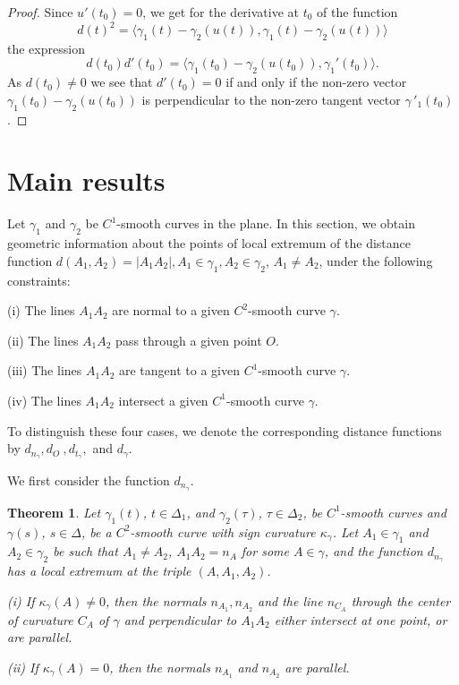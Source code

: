 \documentclass[10pt,a4paper]{amsart}
\newtheorem{thm}{Theorem}
\def\g{\gamma}
\begin{document}
\begin{proof} Since $u'(t_0) =0$, we get for the derivative  at $t_0$ of the function
$$d(t)^2 = \langle \g_1(t) - \g_2(u(t)), \g_1(t) - \g_2(u(t))\rangle$$
the expression
$$ d(t_0) d'(t_0) = \langle \g_1(t_0) - \g_2(u(t_0)), \g_1'(t_0) \rangle.$$
As $d(t_0) \neq 0$ we see that
 $d'(t_0)=0$ if and only if the non-zero vector
 $\g_1(t_0) - \g_2(u(t_0))$ is perpendicular to the non-zero tangent vector $\g\,'_1(t_0)$.
\end{proof}



\section{Main results}\label{mr}

Let $\g_1$ and $\g_2$ be $C^1$-smooth curves in the plane.
In this section, we obtain geometric information about the points of local extremum of the distance function
$d(A_1,A_2)=|A_1A_2| , A_1\in \g_1 , A_2\in \g_2$, $A_1 \neq A_2$, under the following constraints:

(i) The lines $A_1A_2$ are normal to a given $C^2$-smooth curve $\g$.

(ii) The lines $A_1A_2$ pass through a given point $O$.

(iii) The lines $A_1A_2$ are tangent to a given $C^1$-smooth curve $\g$.

(iv) The lines $A_1A_2$ intersect a given $C^1$-smooth curve $\g$.

To distinguish these four cases, we denote the corresponding
distance functions by $d_{n_{\g}}, d_O \ , d_{t_{\g}}, $ and
$d_{\g}$.

We first consider the function $d_{n_{\g}}$.


\begin{thm}\label{A} Let $\g_1(t)$,
$t\in \Delta_1$, and $ \g_2(\tau)$,
$\tau \in \Delta_2$,  be $C^1$-smooth curves
and $\g(s)$, $s \in \Delta$, be a $C^2$-smooth curve with sign curvature
$\kappa_{\g}$. Let $A_1\in \g_1$ and $A_2\in \g_2$ be such that
$A_1\neq A_2$, $A_1A_2=n_A$ for some $A \in \g$, and the function $d_{n_{\g}}$ has a local extremum at the triple $(A, A_1,A_2)$.


(i) If $\kappa_{\g}(A)\neq 0$, then the normals $n_{A_1} ,
n_{A_2}$ and the line $n_{C_A}$ through the center of curvature
$C_A$ of $\g$ and perpendicular to $A_1A_2$ either intersect at
one point, or are parallel.

(ii) If $\kappa_{\g}(A)= 0$, then the normals $n_{A_1}$ and
$n_{A_2}$ are parallel.
\end{thm}
\end{document}
